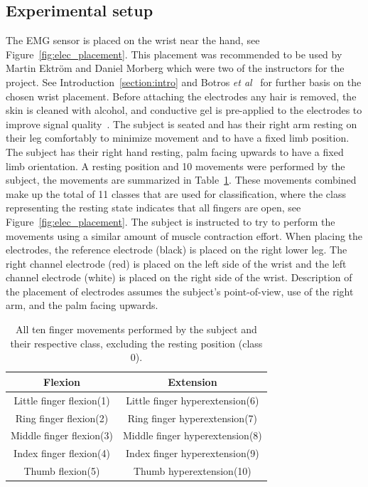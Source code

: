 \subsection{Experimental setup}
The EMG sensor is placed on the wrist near the hand, see Figure~\ref{fig:elec_placement}. This placement was recommended to be used by Martin Ektröm and Daniel Morberg which were two of the instructors for the project. See Introduction~\ref{section:intro} and Botros \textit{et al}~\cite{botrosElectromyographyBasedGestureRecognition2022} for further basis on the chosen wrist placement. Before attaching the electrodes any hair is removed, the skin is cleaned with alcohol, and conductive gel is pre-applied to the electrodes to improve signal quality~\cite{khanSelectionFeaturesClassifiers2020}. The subject is seated and has their right arm resting on their leg comfortably to minimize movement and to have a fixed limb position. The subject has their right hand resting, palm facing upwards to have a fixed limb orientation. A resting position and 10 movements were performed by the subject, the movements are summarized in Table~\ref{tab:finger_movements}. These movements combined make up the total of 11 classes that are used for classification, where the class representing the resting state indicates that all fingers are open, see Figure~\ref{fig:elec_placement}. The subject is instructed to try to perform the movements using a similar amount of muscle contraction effort. When placing the electrodes, the reference electrode (black) is placed on the right lower leg. The right channel electrode (red) is placed on the left side of the wrist and the left channel electrode (white) is placed on the right side of the wrist. Description of the placement of electrodes assumes the subject's point-of-view, use of the right arm, and the palm facing upwards.

\begin{table}[ht]
    \centering
    \begin{tabular}{c|c}
        Flexion                     & Extension                        \\ \hline
        Little finger flexion(1)    & Little finger hyperextension(6)       \\
        Ring finger flexion(2)      & Ring finger hyperextension(7)         \\
        Middle finger flexion(3)    & Middle finger hyperextension(8)       \\
        Index finger flexion(4)     & Index finger hyperextension(9)        \\
        Thumb flexion(5)            & Thumb hyperextension(10)                     
    \end{tabular}
    \caption{All ten finger movements performed by the subject and their respective class, excluding the resting position (class 0).}
    \label{tab:finger_movements}
\end{table}
 
